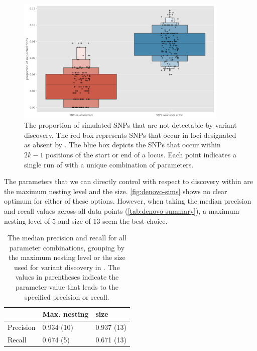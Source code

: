 \begin{figure}
    \centering
    \includegraphics[width=0.9\textwidth]{Chapter1/Figs/denovo_errors.png}
    \caption{The proportion of simulated SNPs that are not detectable by \denovo{} variant discovery. The red box represents SNPs that occur in loci designated as absent by \pandora{}. The blue box depicts the SNPs that occur within $2k-1$ positions of the start or end of a locus. Each point indicates a single run of \pandora{} with a unique combination of parameters.}
    \label{fig:denovo-errors}
\end{figure}

\noindent
The parameters that we can directly control with respect to \denovo{} discovery within \pandora{} are the \prg{} maximum nesting level and the \denovo{} \kmer{} size. \autoref{fig:denovo-sims} shows no clear optimum for either of these options. However, when taking the median precision and recall values across all data points (\autoref{tab:denovo-summary}), a maximum nesting level of 5 and \denovo{} \kmer{} size of 13 seem the best choice.

\begin{table}
\centering
\begin{tabular}{@{}lll@{}}
\toprule
          & Max. nesting & \denovo{} \kmer{} size \\ \midrule
Precision & 0.934 (10)   & 0.937 (13)                                               \\
Recall    & 0.674 (5)    & 0.671 (13)                                               \\ \bottomrule
\end{tabular}
\caption{The median precision and recall for all parameter combinations, grouping by the maximum \prg{} nesting level or the \denovo{} \kmer{} size used for variant discovery in \pandora{}. The values in parentheses indicate the parameter value that leads to the specified precision or recall.}
\label{tab:denovo-summary}
\end{table}

